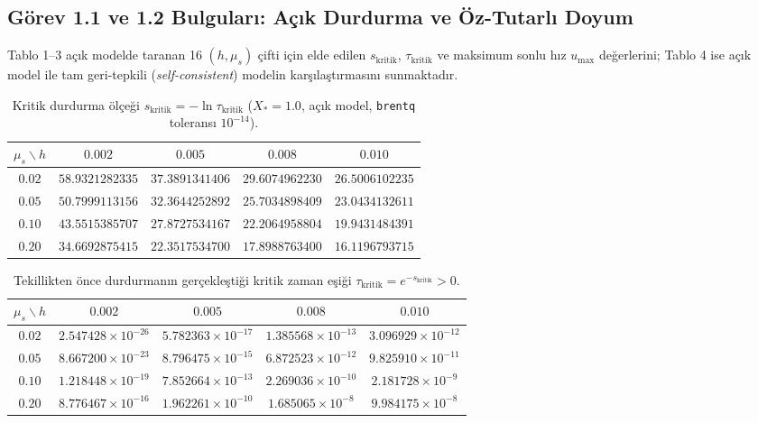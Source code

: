 \documentclass[12pt,a4paper]{article}
\begin{document}
\subsection{Görev 1.1 ve 1.2 Bulguları: Açık Durdurma ve Öz-Tutarlı Doyum}

Tablo 1--3 açık modelde taranan 16 $(h, \mu_s)$ çifti için elde edilen $s_{\mathrm{kritik}}$, $\tau_{\mathrm{kritik}}$ ve maksimum sonlu hız $u_{\max}$ değerlerini; Tablo 4 ise açık model ile tam geri-tepkili (\textit{self-consistent}) modelin karşılaştırmasını sunmaktadır.

\begin{table}[htbp]
\centering
\caption{Kritik durdurma ölçeği $s_{\mathrm{kritik}} = -\ln \tau_{\mathrm{kritik}}$ ($X_*=1.0$, açık model, \texttt{brentq} toleransı $10^{-14}$).}
\vspace{0.15cm}
\begin{tabular}{c|cccc}
\hline
$\mu_s \backslash h$ & $0.002$ & $0.005$ & $0.008$ & $0.010$ \\
\hline
$0.02$ & $58.9321282335$ & $37.3891341406$ & $29.6074962230$ & $26.5006102235$ \\
$0.05$ & $50.7999113156$ & $32.3644252892$ & $25.7034898409$ & $23.0434132611$ \\
$0.10$ & $43.5515385707$ & $27.8727534167$ & $22.2064958804$ & $19.9431484391$ \\
$0.20$ & $34.6692875415$ & $22.3517534700$ & $17.8988763400$ & $16.1196793715$ \\
\hline
\end{tabular}
\end{table}

\begin{table}[htbp]
\centering
\footnotesize
\setlength{\tabcolsep}{4pt}
\caption{Tekillikten önce durdurmanın gerçekleştiği kritik zaman eşiği $\tau_{\mathrm{kritik}} = e^{-s_{\mathrm{kritik}}} > 0$.}
\vspace{0.15cm}
\begin{tabular}{c|cccc}
\hline
$\mu_s \backslash h$ & $0.002$ & $0.005$ & $0.008$ & $0.010$ \\
\hline
$0.02$ & $2.547428 \times 10^{-26}$ & $5.782363 \times 10^{-17}$ & $1.385568 \times 10^{-13}$ & $3.096929 \times 10^{-12}$ \\
$0.05$ & $8.667200 \times 10^{-23}$ & $8.796475 \times 10^{-15}$ & $6.872523 \times 10^{-12}$ & $9.825910 \times 10^{-11}$ \\
$0.10$ & $1.218448 \times 10^{-19}$ & $7.852664 \times 10^{-13}$ & $2.269036 \times 10^{-10}$ & $2.181728 \times 10^{-9}$ \\
$0.20$ & $8.776467 \times 10^{-16}$ & $1.962261 \times 10^{-10}$ & $1.685065 \times 10^{-8}$ & $9.984175 \times 10^{-8}$ \\
\hline
\end{tabular}
\end{table}
\end{document}
